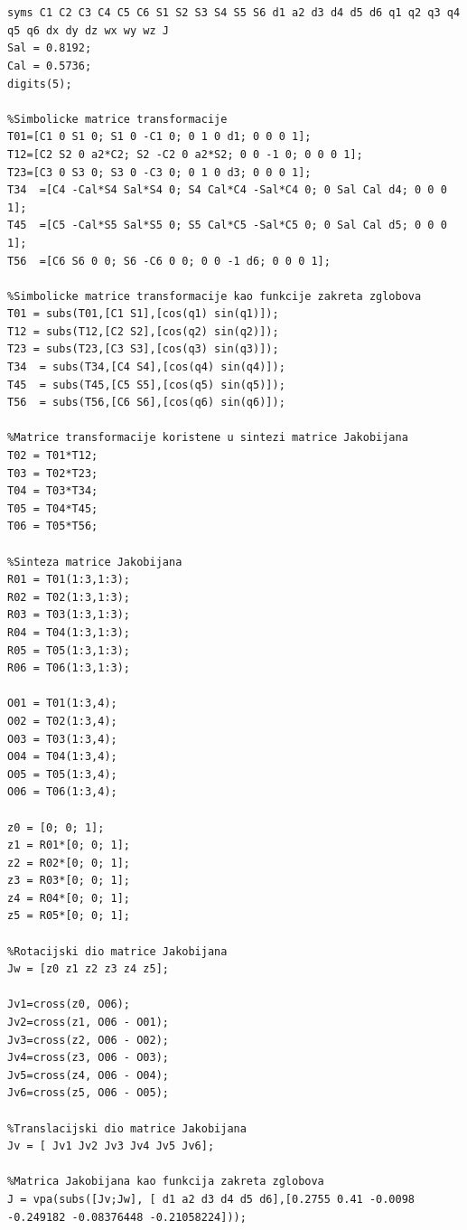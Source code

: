 \documentclass[times, utf8, diplomski, numeric]{fer}
\begin{document}
\chapter{}\label{kinematkod}
\begin{lstlisting}
syms C1 C2 C3 C4 C5 C6 S1 S2 S3 S4 S5 S6 d1 a2 d3 d4 d5 d6 q1 q2 q3 q4 q5 q6 dx dy dz wx wy wz J
Sal = 0.8192;
Cal = 0.5736;
digits(5);

%Simbolicke matrice transformacije
T01=[C1 0 S1 0; S1 0 -C1 0; 0 1 0 d1; 0 0 0 1];
T12=[C2 S2 0 a2*C2; S2 -C2 0 a2*S2; 0 0 -1 0; 0 0 0 1];
T23=[C3 0 S3 0; S3 0 -C3 0; 0 1 0 d3; 0 0 0 1];
T34  =[C4 -Cal*S4 Sal*S4 0; S4 Cal*C4 -Sal*C4 0; 0 Sal Cal d4; 0 0 0 1];
T45  =[C5 -Cal*S5 Sal*S5 0; S5 Cal*C5 -Sal*C5 0; 0 Sal Cal d5; 0 0 0 1];
T56  =[C6 S6 0 0; S6 -C6 0 0; 0 0 -1 d6; 0 0 0 1];

%Simbolicke matrice transformacije kao funkcije zakreta zglobova
T01 = subs(T01,[C1 S1],[cos(q1) sin(q1)]);
T12 = subs(T12,[C2 S2],[cos(q2) sin(q2)]);
T23 = subs(T23,[C3 S3],[cos(q3) sin(q3)]);
T34  = subs(T34,[C4 S4],[cos(q4) sin(q4)]);
T45  = subs(T45,[C5 S5],[cos(q5) sin(q5)]);
T56  = subs(T56,[C6 S6],[cos(q6) sin(q6)]);

%Matrice transformacije koristene u sintezi matrice Jakobijana
T02 = T01*T12;
T03 = T02*T23;
T04 = T03*T34;
T05 = T04*T45;
T06 = T05*T56;

%Sinteza matrice Jakobijana
R01 = T01(1:3,1:3);
R02 = T02(1:3,1:3);
R03 = T03(1:3,1:3);
R04 = T04(1:3,1:3);
R05 = T05(1:3,1:3);
R06 = T06(1:3,1:3);

O01 = T01(1:3,4);
O02 = T02(1:3,4);
O03 = T03(1:3,4);
O04 = T04(1:3,4);
O05 = T05(1:3,4);
O06 = T06(1:3,4);

z0 = [0; 0; 1];
z1 = R01*[0; 0; 1];
z2 = R02*[0; 0; 1];
z3 = R03*[0; 0; 1];
z4 = R04*[0; 0; 1];
z5 = R05*[0; 0; 1];

%Rotacijski dio matrice Jakobijana
Jw = [z0 z1 z2 z3 z4 z5];

Jv1=cross(z0, O06);
Jv2=cross(z1, O06 - O01);
Jv3=cross(z2, O06 - O02);
Jv4=cross(z3, O06 - O03);
Jv5=cross(z4, O06 - O04);
Jv6=cross(z5, O06 - O05);

%Translacijski dio matrice Jakobijana
Jv = [ Jv1 Jv2 Jv3 Jv4 Jv5 Jv6];

%Matrica Jakobijana kao funkcija zakreta zglobova
J = vpa(subs([Jv;Jw], [ d1 a2 d3 d4 d5 d6],[0.2755 0.41 -0.0098 -0.249182 -0.08376448 -0.21058224]));
\end{lstlisting}
\end{document}
